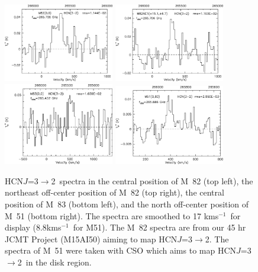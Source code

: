 \documentclass[legal,11pt]{article}
\def\kms    {\ifmmode{{\rm \ts km\ts s}^{-1}}\else{\ts km\ts s$^{-1}$}\fi}
\def\kms    {km\,s$^{-1}$\,}
\def\,{\thinspace}
\def\HCNtt        {HCN\,$J$=3$\rightarrow$2}
\begin{document}
\begin{figure}
\centering

\includegraphics[width=0.43\textwidth]{m82_00.eps}
\hskip10pt
\includegraphics[width=0.43\textwidth]{m82_ne01.eps}
\includegraphics[width=0.43\textwidth]{m83_00.eps}
\hskip10pt
\includegraphics[width=0.43\textwidth]{m51_00.eps}

\caption{
\HCNtt\ spectra in the central position of M~82 (top left), the northeast
off-center position of M~82 (top right), the central position of M~83 (bottom
left), and the north off-center position of M~51 (bottom right).  The spectra
are smoothed to 17 \kms\ for display (8.8\kms\ for M51). The M~82 spectra are
from our 45 hr  JCMT Project (M15AI50) aiming to map \HCNtt. The spectra of
M~51 were taken with CSO which aims to map \HCNtt\ in the disk region.  }

\label{fig:spe-hcn32}
\end{figure}
\end{document}
